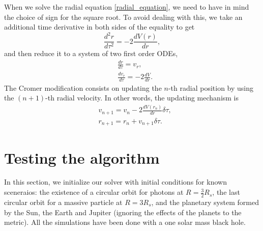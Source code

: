 \documentclass[journal, a4paper]{IEEEtran}
\begin{document}
When we solve the radial equation \ref{radial_equation}, we need to have in mind the choice of sign for the square root. To avoid dealing with this, we take an additional time derivative in both sides of the equality to get
\begin{equation}
	\frac{d^2r}{d \tau^2} = - 2 \frac{d V(r)}{dr},
\end{equation}
and then reduce it to a system of two first order ODEs,
\begin{equation}
	\begin{split}
		&\frac{dr}{d \tau } = v_r, \\
		&\frac{dv_r}{d \tau} = - 2 \frac{dV}{dr}.
	\end{split}
\end{equation}
The Cromer modification consists on updating the $n$-th radial position by using the $(n+1)$-th radial velocity. In other words, the updating mechanism is
\begin{equation}
	\begin{split}
		&v_{n+1} = v_{n} - 2 \frac{dV(r_n)}{dr}  \delta \tau , \\
		&r_{n+1} = r_n + v_{n+1} \delta \tau.  
	\end{split}
\end{equation}

\section{Testing the algorithm}
In this section, we initialize our solver with initial conditions for known sceneraios: the existence of a circular orbit for photons at $R=\frac{3}{2}R_s$, the last circular orbit for a massive particle at $R=3R_s$, and the planetary system formed by the Sun, the Earth and Jupiter (ignoring the effects of the planets to the metric). All the simulations have been done with a one solar mass black hole.
\end{document}
